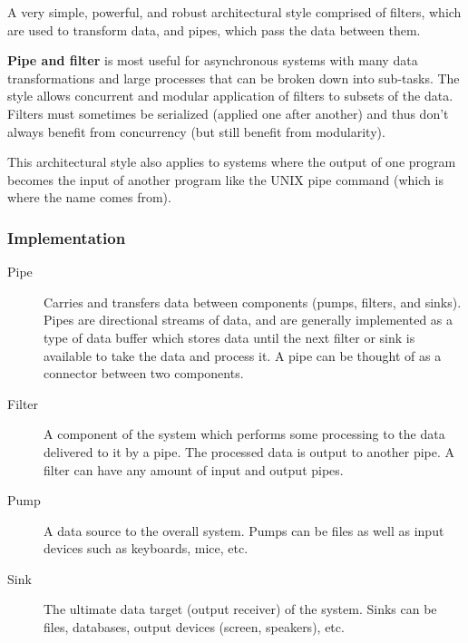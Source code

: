 \begin{summary}

    A very simple, powerful, and robust architectural style comprised of
    filters, which are used to transform data, and pipes, which pass the data
    between them.

    {\bf Pipe and filter} is most useful for asynchronous systems with many
    data transformations and large processes that can be broken down into
    sub-tasks. The style allows concurrent and modular application of filters
    to subsets of the data. Filters must sometimes be serialized (applied
    one after another) and thus don’t always benefit from concurrency (but
    still benefit from modularity). 
    
    This architectural style also applies to systems where the output of one
    program becomes the input of another program like the UNIX pipe command
    (which is where the name comes from).

\end{summary}

\subsubsection{Implementation}

\begin{description}
    \item[Pipe] Carries and transfers data between components (pumps,
        filters, and sinks). Pipes are directional streams of data, and are
        generally implemented as a type of data buffer which stores data until
        the next filter or sink is available to take the data and process it. A
        pipe can be thought of as a connector between two components.

    \item[Filter] A component of the system which performs some processing to
        the data delivered to it by a pipe. The processed data is output to
        another pipe. A filter can have any amount of input and output pipes.

    \item[Pump] A data source to the overall system. Pumps can be files as well
        as input devices such as keyboards, mice, etc.

    \item[Sink] The ultimate data target (output receiver) of the system.
        Sinks can be files, databases, output devices (screen, speakers), etc.
\end{description}

